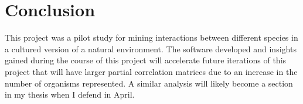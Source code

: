 \documentclass[12pt]{article}
\begin{document}
\section{Conclusion}
This project was a pilot study for mining interactions between different species in a cultured version of a natural environment.
The software developed and insights gained during the course of this project will accelerate future iterations of this project that will have larger partial correlation matrices due to an increase in the number of organisms represented. 
A similar analysis will likely become a section in my thesis when I defend in April. 

%


 
 
\end{document}
